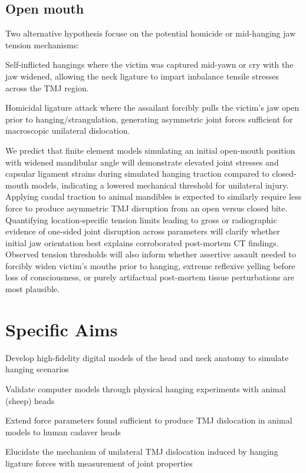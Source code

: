 \documentclass{article}
\begin{document}
\subsection{Open mouth}
Two alternative hypothesis focuse on the potential homicide or mid-hanging jaw tension mechanisms:

\begin{outline}

\1 Self-inflicted hangings where the victim was captured mid-yawn or cry with the jaw widened, allowing the neck ligature to impart imbalance tensile stresses across the TMJ region.

\1 Homicidal ligature attack where the assailant forcibly pulls the victim’s jaw open prior to hanging/strangulation, generating asymmetric joint forces sufficient for macroscopic unilateral dislocation.

\end{outline}

We predict that finite element models simulating an initial open-mouth position with widened mandibular angle will demonstrate elevated joint stresses and capsular ligament strains during simulated hanging traction compared to closed-mouth models, indicating a lowered mechanical threshold for unilateral injury.
Applying caudal traction to animal mandibles is expected to similarly require less force to produce asymmetric TMJ disruption from an open versus closed bite. Quantifying location-specific tension limits leading to gross or radiographic evidence of one-sided joint disruption across parameters will clarify whether initial jaw orientation best explains corroborated post-mortem CT findings.
Observed tension thresholds will also inform whether assertive assault needed to forcibly widen victim’s mouths prior to hanging, extreme reflexive yelling before loss of consciousness, or purely artifactual post-mortem tissue perturbations are most plausible.

%
\section{Specific Aims}
\begin{outline}
\1 Develop high-fidelity digital models of the head and neck anatomy to simulate hanging scenarios

\1 Validate computer models through physical hanging experiments with animal (sheep) heads  

\1 Extend force parameters found sufficient to produce TMJ dislocation in animal models to human cadaver heads

\1 Elucidate the mechanism of unilateral TMJ dislocation induced by hanging ligature forces with measurement of joint properties

\end{outline}
\end{document}
